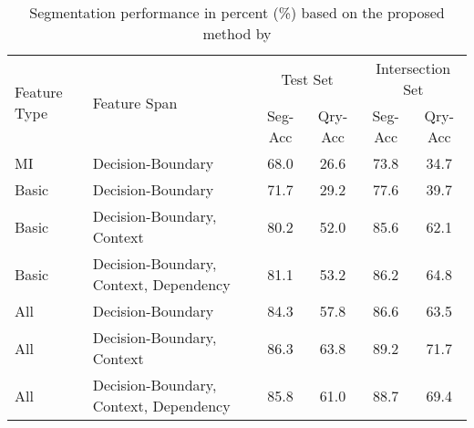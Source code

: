 \begin{table*}[t]
 \caption{Segmentation performance in percent (\%) based on the proposed method by \citet{Bergsma:2007}}
 \label{table-segmentation-performance-bergsma-2007}
 \centering
 \small
 \begin{tabular}{@{}llcccc@{}}
  \toprule
  \multirow{2}{*}{Feature Type} & \multirow{2}{*}{Feature Span} & \multicolumn{2}{c}{Test Set} & \multicolumn{2}{c}{Intersection Set} \\
  && Seg-Acc & Qry-Acc & Seg-Acc & Qry-Acc\\
  \midrule
  \midrule
  MI & Decision-Boundary & 68.0 & 26.6 & 73.8 & 34.7\\
  \midrule
  Basic & Decision-Boundary & 71.7 & 29.2 & 77.6 & 39.7\\
  Basic & Decision-Boundary, Context & 80.2 & 52.0 & 85.6 & 62.1\\
  Basic & Decision-Boundary, Context, Dependency & 81.1 & 53.2 & 86.2 & 64.8\\
  \midrule
  All & Decision-Boundary & 84.3 & 57.8 & 86.6 & 63.5\\
  All & Decision-Boundary, Context & 86.3 & 63.8 & 89.2 & 71.7\\
  All & Decision-Boundary, Context, Dependency & 85.8 & 61.0 & 88.7 & 69.4\\
  \bottomrule
 \end{tabular}
\end{table*}